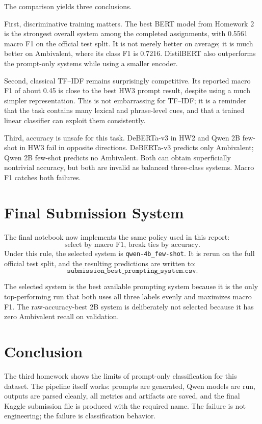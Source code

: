 \documentclass[12pt]{fphw}
\newcommand{\AMB}{Ambivalent}
\begin{document}
The comparison yields three conclusions.

First, discriminative training matters. The best BERT model from Homework 2 is the strongest overall system among the completed assignments, with 0.5561 macro F1 on the official test split. It is not merely better on average; it is much better on \AMB, where its class F1 is 0.7216. DistilBERT also outperforms the prompt-only systems while using a smaller encoder.

Second, classical TF--IDF remains surprisingly competitive. Its reported macro F1 of about 0.45 is close to the best HW3 prompt result, despite using a much simpler representation. This is not embarrassing for TF--IDF; it is a reminder that the task contains many lexical and phrase-level cues, and that a trained linear classifier can exploit them consistently.

Third, accuracy is unsafe for this task. DeBERTa-v3 in HW2 and Qwen 2B few-shot in HW3 fail in opposite directions. DeBERTa-v3 predicts only \AMB; Qwen 2B few-shot predicts no \AMB. Both can obtain superficially nontrivial accuracy, but both are invalid as balanced three-class systems. Macro F1 catches both failures.

\section{Final Submission System}

The final notebook now implements the same policy used in this report:
\[
\text{select by macro F1, break ties by accuracy.}
\]
Under this rule, the selected system is \texttt{qwen-4b\_few-shot}. It is rerun on the full official test split, and the resulting predictions are written to:
\[
\texttt{submission\_best\_prompting\_system.csv}.
\]

The selected system is the best available prompting system because it is the only top-performing run that both uses all three labels evenly and maximizes macro F1. The raw-accuracy-best 2B system is deliberately not selected because it has zero \AMB{} recall on validation.

\section{Conclusion}

The third homework shows the limits of prompt-only classification for this dataset. The pipeline itself works: prompts are generated, Qwen models are run, outputs are parsed cleanly, all metrics and artifacts are saved, and the final Kaggle submission file is produced with the required name. The failure is not engineering; the failure is classification behavior.
\end{document}

